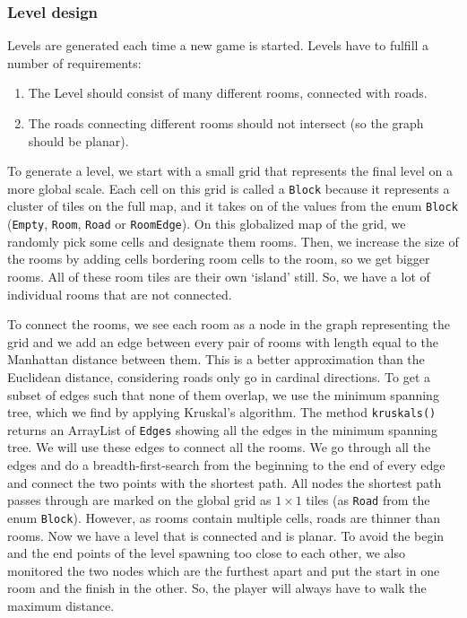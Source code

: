 \documentclass[../main.tex]{subfiles}
\begin{document}
		\subsubsection{Level design}\label{sec: level design}
		Levels are generated each time a new game is started. Levels have to fulfill a number of requirements:
		\begin {enumerate}
			\item {The Level should consist of many different rooms, connected with roads}.
			\item {The roads connecting different rooms should not intersect (so the graph should be planar).}
		\end {enumerate}
		To generate a level, we start with a small grid that represents the final level on a more global scale. Each cell on this grid is called a \texttt{Block} because it represents a cluster of tiles on the full map, and it takes on of the values from the enum \texttt{Block} (\texttt{Empty}, \texttt{Room}, \texttt{Road} or \texttt{RoomEdge}). On this globalized map of the grid, we randomly pick some cells and designate them rooms. Then, we increase the size of the rooms by adding cells bordering room cells to the room, so we get bigger rooms. All of these room tiles are their own `island' still. So, we have a lot of individual rooms that are not connected. 
		
		To connect the rooms, we see each room as a node in the graph representing the grid and we add an edge between every pair of rooms with length equal to the Manhattan distance between them. This is a better approximation than the Euclidean distance, considering roads only go in cardinal directions. To get a subset of edges such that none of them overlap, we use the minimum spanning tree, which we find by applying Kruskal's algorithm. The method \texttt{kruskals()} returns an ArrayList of \texttt{Edges} showing all the edges in the minimum spanning tree. We will use these edges to connect all the rooms. We go through all the edges and do a breadth-first-search from the beginning to the end of every edge and connect the two points with the shortest path. All nodes the shortest path passes through are marked on the global grid as $1\times1$ tiles (as \texttt{Road} from the enum \texttt{Block}). However, as rooms contain multiple cells, roads are thinner than rooms. Now we have a level that is connected and is planar. To avoid the begin and the end points of the level spawning too close to each other, we also monitored the two nodes which are the furthest apart and put the start in one room and the finish in the other. So, the player will always have to walk the maximum distance. 
		
\end{document}
